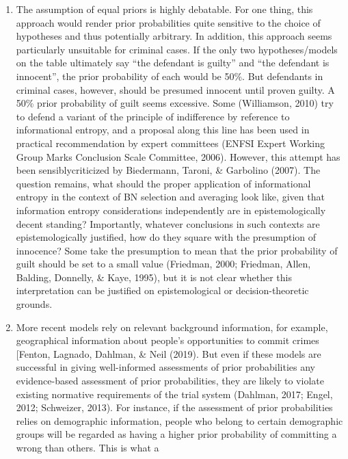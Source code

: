 \documentclass[11pt,dvipsnames,enabledeprecatedfontcommands]{scrartcl}
\begin{document}
\begin{enumerate}
\def\labelenumi{\Alph{enumi}.}
\setcounter{enumi}{4}
\item
  The assumption of equal priors is highly debatable. For one thing,
  this approach would render prior probabilities quite sensitive to the
  choice of hypotheses and thus potentially arbitrary. In addition, this
  approach seems particularly unsuitable for criminal cases. If the only
  two hypotheses/models on the table ultimately say ``the defendant is
  guilty'' and ``the defendant is innocent'', the prior probability of
  each would be 50\%. But defendants in criminal cases, however, should
  be presumed innocent until proven guilty. A 50\% prior probability of
  guilt seems excessive. Some (Williamson, 2010) try to defend a variant
  of the principle of indifference by reference to informational
  entropy, and a proposal along this line has been used in practical
  recommendation by expert committees (ENFSI Expert Working Group Marks
  Conclusion Scale Committee, 2006). However, this attempt has been
  sensiblycriticized by Biedermann, Taroni, \& Garbolino (2007). The
  question remains, what should the proper application of informational
  entropy in the context of BN selection and averaging look like, given
  that information entropy considerations independently are in
  epistemologically decent standing? Importantly, whatever conclusions
  in such contexts are epistemologically justified, how do they square
  with the presumption of innocence? Some take the presumption to mean
  that the prior probability of guilt should be set to a small value
  (Friedman, 2000; Friedman, Allen, Balding, Donnelly, \& Kaye, 1995),
  but it is not clear whether this interpretation can be justified on
  epistemological or decision-theoretic grounds.
\item
  More recent models rely on relevant background information, for
  example, geographical information about people's opportunities to
  commit crimes {[}Fenton, Lagnado, Dahlman, \& Neil (2019). But even if
  these models are successful in giving well-informed assessments of
  prior probabilities any evidence-based assessment of prior
  probabilities, they are likely to violate existing normative
  requirements of the trial system (Dahlman, 2017; Engel, 2012;
  Schweizer, 2013). For instance, if the assessment of prior
  probabilities relies on demographic information, people who belong to
  certain demographic groups will be regarded as having a higher prior
  probability of committing a wrong than others. This is what a

\end{enumerate}
\end{document}
